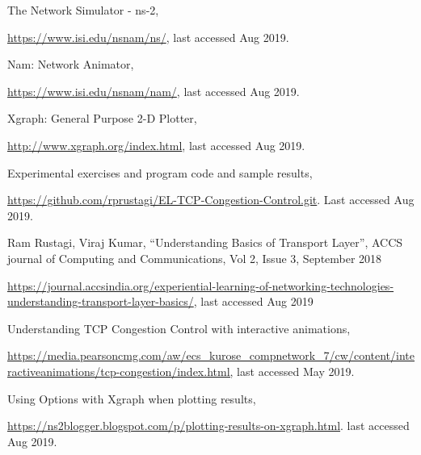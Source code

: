 \begin{multicols}{2}
\begin{thebibliography}{99}
 The Network Simulator - ns-2,

\url{https://www.isi.edu/nsnam/ns/}, last accessed Aug 2019.

 Nam: Network Animator,

\url{ https://www.isi.edu/nsnam/nam/}, last accessed Aug 2019.

 Xgraph: General Purpose 2-D Plotter, 

\url{http://www.xgraph.org/index.html}, last accessed Aug 2019.

 Experimental exercises and program code and sample results, 

\url{https://github.com/rprustagi/EL-TCP-Congestion-Control.git}. Last accessed Aug 2019.

 Ram Rustagi, Viraj Kumar, “Understanding Basics of Transport Layer”, ACCS journal of Computing and Communications, Vol 2, Issue 3, September 2018 

\url{https://journal.accsindia.org/experiential-learning-of-networking-technologies-understanding-transport-layer-basics/}, last accessed Aug 2019

 Understanding TCP Congestion Control with interactive animations,

\url{https://media.pearsoncmg.com/aw/ecs\_kurose\_compnetwork\_7/cw/content/interactiveanimations/tcp-congestion/index.html,} last accessed May 2019.

 Using Options with Xgraph when plotting results,

\url{https://ns2blogger.blogspot.com/p/plotting-results-on-xgraph.html}. last accessed Aug 2019.

\end{thebibliography}
\end{multicols}






